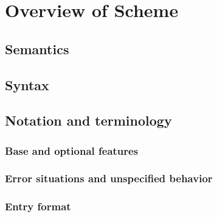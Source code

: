 
\chapter{Overview of Scheme}

\section{Semantics}
\label{semanticsection}

\section{Syntax}

\section{Notation and terminology}

\subsection{Base and optional features}
\label{qualifiers}

\subsection{Error situations and unspecified behavior}
\label{errorsituations}

\subsection{Entry format}



